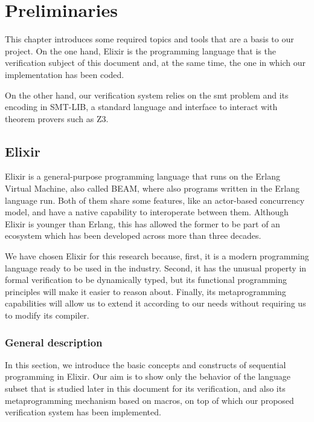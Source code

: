 \chapter{Preliminaries}
\label{cap:preliminaries}

This chapter introduces some required topics and tools that are a basis to our
project. On the one hand, Elixir is the programming language that is the
verification subject of this document and, at the same time, the one in which
our implementation has been coded.

On the other hand, our verification system relies on the \gls{smt} problem and
its encoding in SMT-LIB, a standard language and interface to interact with
theorem provers such as Z3.

\section{Elixir}

Elixir is a general-purpose programming language that runs on the Erlang Virtual
Machine, also called BEAM, where also programs written in the Erlang language
run. Both of them share some features, like an actor-based concurrency model,
and have a native capability to interoperate between them. Although Elixir is
younger than Erlang, this has allowed the former to be part of an ecosystem
which has been developed across more than three decades.

We have chosen Elixir for this research because, first, it is a modern
programming language ready to be used in the industry.  Second, it has the
unusual property in formal verification to be dynamically typed, but its
functional programming principles will make it easier to reason about. Finally,
its metaprogramming capabilities will allow us to extend it according to our
needs without requiring us to modify its compiler.

\subsection{General description}
\label{prelim:elixir}

In this section, we introduce the basic concepts and constructs of sequential
programming in Elixir. Our aim is to show only the behavior of the language
subset that is studied later in this document for its verification, and also its
metaprogramming mechanism based on macros, on top of which our proposed
verification system has been implemented.

